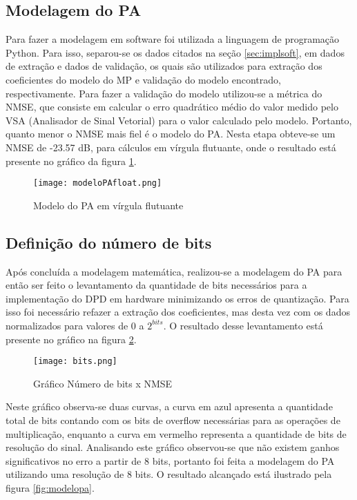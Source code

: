 \subsection{Modelagem do PA}

Para fazer a modelagem em software foi utilizada a linguagem de programação Python. Para isso, separou-se os dados citados na seção \ref{sec:implsoft}, em dados de extração e dados de validação, os quais são utilizados para extração dos coeficientes do modelo do MP e validação do modelo encontrado, respectivamente. Para fazer a validação do modelo utilizou-se a métrica do NMSE, que consiste em calcular o erro quadrático médio do valor medido pelo VSA (Analisador de Sinal Vetorial) para o valor calculado pelo modelo. Portanto, quanto menor o NMSE mais fiel é o modelo do PA. Nesta etapa obteve-se um NMSE de -23.57 dB, para cálculos em vírgula flutuante, onde o resultado está presente no gráfico da figura \ref{fig:modelopafloat}.

\begin{figure}[htbp!]
    \centering
    \captionsetup{justification=centering}
    \texttt{[image: modeloPAfloat.png]}
    \caption{Modelo do PA em vírgula flutuante}
    \label{fig:modelopafloat}
\end{figure}

\subsection{Definição do número de bits}

Após concluída a modelagem matemática, realizou-se a modelagem do PA para então ser feito o levantamento da quantidade de bits necessários para a implementação do DPD em hardware minimizando os erros de quantização. 
Para isso foi necessário refazer a extração dos coeficientes, mas desta vez com os dados normalizados para valores de 0 a $2^{bits}$.  
O resultado desse levantamento está presente no gráfico na figura \ref{fig:bits}.

\begin{figure}[htbp!]
    \centering
    \captionsetup{justification=centering}
    \texttt{[image: bits.png]}
    \caption{Gráfico Número de bits x NMSE}
    \label{fig:bits}
\end{figure}

Neste gráfico observa-se duas curvas, a curva em azul apresenta a quantidade total de bits contando com os bits de overflow necessárias para as operações de multiplicação, enquanto a curva em vermelho representa a quantidade de bits de resolução do sinal. Analisando este gráfico observou-se que não existem ganhos significativos no erro a partir de 8 bits, portanto foi feita a modelagem do PA utilizando uma resolução de 8 bits. O resultado alcançado está ilustrado pela figura \ref{fig:modelopa}.

